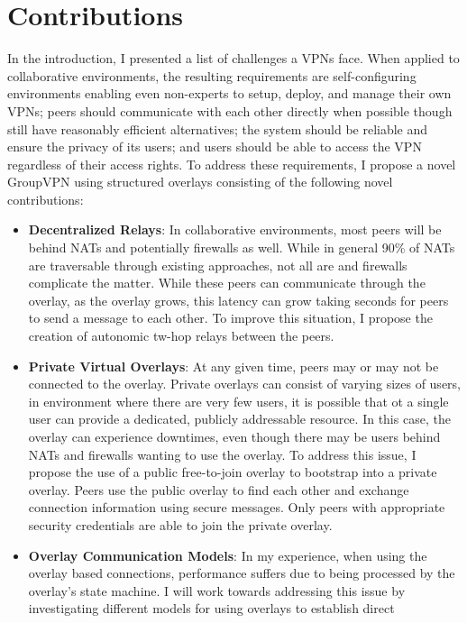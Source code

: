 \section{Contributions}
In the introduction, I presented a list of challenges a VPNs face.  When
applied to collaborative environments, the resulting requirements are 
self-configuring environments enabling even non-experts to setup, deploy,
and manage their own VPNs; peers should communicate with each other
directly when possible though still have reasonably efficient alternatives;
the system should be reliable and ensure the privacy of its users; and
users should be able to access the VPN regardless of their access rights.
To address these requirements, I propose a novel GroupVPN using structured
overlays consisting of the following novel contributions:

\begin{itemize}
\item \textbf{Decentralized Relays}:  In collaborative environments, most peers
will be behind NATs and potentially firewalls as well.  While in general 90\% of
NATs are traversable through existing approaches, not all are and firewalls
complicate the matter.  While these peers can communicate through the overlay,
as the overlay grows, this latency can grow taking seconds for peers to send
a message to each other.  To improve this situation, I propose the creation of
autonomic tw-hop relays between the peers.
\item \textbf{Private Virtual Overlays}:  At any given time, peers may or may
not be connected to the overlay.  Private overlays can consist of varying sizes
of users, in environment where there are very few users, it is possible that
ot a single user can provide a dedicated, publicly addressable  resource.  In
this case, the overlay can experience downtimes, even though there may be users
behind NATs and firewalls wanting to use the overlay.  To address this issue,
I propose the use of a public free-to-join overlay to bootstrap into a private
overlay.  Peers use the public overlay to find each other and exchange connection
information using secure messages.  Only peers with appropriate security
credentials are able to join the private overlay.
\item \textbf{Overlay Communication Models}: In my experience, when using the
overlay based connections, performance suffers due to being processed by the
overlay's state machine.  I will work towards addressing this issue by
investigating different models for using overlays to establish direct

\end{itemize}
